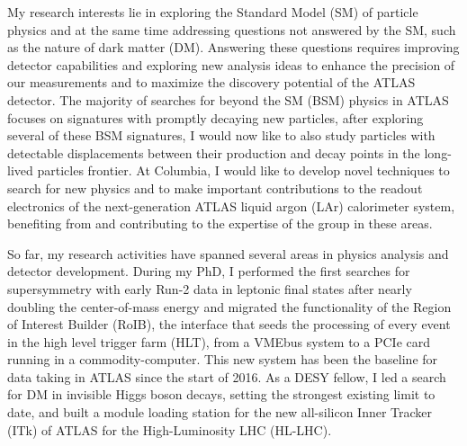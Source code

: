 \documentclass[a4paper]{article}
\begin{document}
\thispagestyle{fancy} 
 \lfoot{} \rfoot{\bf \thepage} \cfoot{}

\fontsize{11}{14}
\selectfont

My research interests lie in exploring the Standard Model (SM) of particle physics and at the same time addressing questions not answered by the SM, such as the nature of dark matter (DM). Answering these questions requires improving detector capabilities and exploring new analysis ideas to enhance the precision of our measurements and to maximize the discovery potential of the ATLAS detector. The majority of searches for beyond the SM (BSM) physics in ATLAS focuses on signatures with promptly decaying new particles, after exploring several of these BSM signatures, I would now like to also study particles with detectable displacements between their production and decay points in the long-lived particles frontier. At Columbia, I would like to develop novel techniques to search for new physics and to make important contributions to the readout electronics of the next-generation ATLAS liquid argon (LAr) calorimeter system, benefiting from and contributing to the expertise of the group in these areas.

\bigskip

So far, my research activities have spanned several areas in physics analysis and detector development. During my PhD, I performed the first searches for supersymmetry with early Run-2 data in leptonic final states after nearly doubling the center-of-mass energy and migrated the functionality of the Region of Interest Builder (RoIB), the interface that seeds the processing of every event in the high level trigger farm (HLT), from a VMEbus system to a PCIe card running in a commodity-computer. This new system has been the baseline for data taking in ATLAS since the start of 2016. As a DESY fellow, I led a search for DM in invisible Higgs boson decays, setting the strongest existing limit to date, and built a module loading station for the new all-silicon Inner Tracker (ITk) of ATLAS for the High-Luminosity LHC (HL-LHC).

\bigskip
\end{document}
